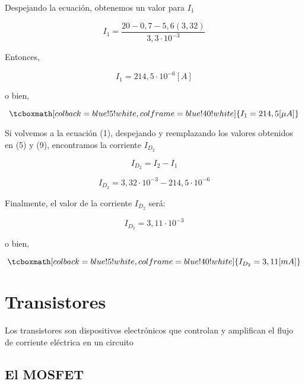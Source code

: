 \documentclass[11pt,fancy,lang=es]{elegantbook}
\begin{document}
    Despejando la ecuación, obtenemos un valor para {$I_1$}

    \begin{equation}
        I_1 = \frac{20 - 0,7 - 5,6(3,32)}{3,3 \cdot 10^{-3}}
    \end{equation}

    Entonces,

    \begin{equation}
        I_1 = 214,5 \cdot 10^{-6} [A]
    \end{equation}

    o bien,

    \begin{equation}
        \tcboxmath[colback=blue!5!white,colframe=blue!40!white]
        {I_1 = 214,5 [\mu A]}
    \end{equation}

    Si volvemos a la ecuación (1), despejando y reemplazando los valores obtenidos en (5) y (9), encontramos la corriente ${I_{D_2}}$

    \begin{equation}
        I_{D_2} = I_2 - I_1
    \end{equation}

    \begin{equation}
        I_{D_2} = 3,32 \cdot 10^{-3} - 214,5 \cdot 10^{-6}
    \end{equation}

    Finalmente, el valor de la corriente {$I_{D_2}$} será:

    \begin{equation}
        I_{D_2} = 3,11 \cdot 10^{-3}
    \end{equation}

    o bien,

    \begin{equation}
        \tcboxmath[colback=blue!5!white,colframe=blue!40!white]
        {I_{D_2} = 3,11 [mA]}
    \end{equation}

\fi

\section{Transistores}
\begin{remark}
    Los transistores son dispositivos electrónicos que controlan y amplifican el flujo de corriente eléctrica en un circuito
\end{remark}

\subsection{El MOSFET}
\end{document}
